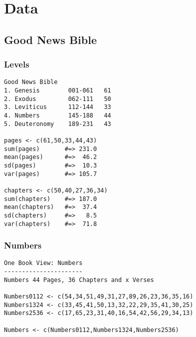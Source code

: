 \documentclass{article}
\begin{document}
\section{Data}

\subsection{Good News Bible}
\subsubsection{Levels}
\begin{verbatim}
Good News Bible
1. Genesis        001-061   61
2. Exodus         062-111   50
3. Leviticus      112-144   33
4. Numbers        145-188   44
5. Deuteronomy    189-231   43

pages <- c(61,50,33,44,43)
sum(pages)       #=> 231.0
mean(pages)      #=>  46.2
sd(pages)        #=>  10.3
var(pages)       #=> 105.7

chapters <- c(50,40,27,36,34)
sum(chapters)    #=> 187.0
mean(chapters)   #=>  37.4  
sd(chapters)     #=>   8.5
var(chapters)    #=>  71.8

\end{verbatim}
\subsubsection{Numbers}
\begin{verbatim}
One Book View: Numbers
----------------------
Numbers 44 Pages, 36 Chapters and x Verses

Numbers0112 <- c(54,34,51,49,31,27,89,26,23,36,35,16)
Numbers1324 <- c(33,45,41,50,13,32,22,29,35,41,30,25)
Numbers2536 <- c(17,65,23,31,40,16,54,42,56,29,34,13)

Numbers <- c(Numbers0112,Numbers1324,Numbers2536)
\end{verbatim}
\end{document}
